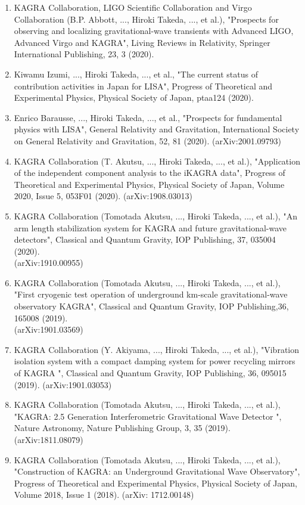 \documentclass[12pt,a4paper]{article}
\begin{document}
\begin{enumerate}
\item KAGRA Collaboration, LIGO Scientific Collaboration and Virgo Collaboration (B.P. Abbott, ..., Hiroki Takeda, ..., et al.), "Prospects for observing and localizing gravitational-wave transients with Advanced LIGO, Advanced Virgo and KAGRA", Living Reviews in Relativity, Springer International Publishing, 23, 3 (2020).

\item Kiwamu Izumi, ..., Hiroki Takeda, ..., et al., "The current status of contribution activities in Japan for LISA", Progress of Theoretical and Experimental Physics, Physical Society of Japan, ptaa124 (2020).

\item Enrico Barausse, ..., Hiroki Takeda, ..., et al., "Prospects for fundamental physics with LISA", General Relativity and Gravitation, International Society on General Relativity and Gravitation, 52, 81 (2020). (arXiv:2001.09793)

\item KAGRA Collaboration (T. Akutsu, ..., Hiroki Takeda, ..., et al.), "Application of the independent component analysis to the iKAGRA data", Progress of Theoretical and Experimental Physics, Physical Society of Japan, Volume 2020, Issue 5, 053F01 (2020). (arXiv:1908.03013)

\item KAGRA Collaboration (Tomotada Akutsu, ..., Hiroki Takeda, ..., et al.), "An arm length stabilization system for KAGRA and future gravitational-wave detectors", Classical and Quantum Gravity, IOP Publishing, 37, 035004 (2020).\\ (arXiv:1910.00955)

\item KAGRA Collaboration (Tomotada Akutsu, ..., Hiroki Takeda, ..., et al.), "First cryogenic test operation of underground km-scale gravitational-wave observatory KAGRA", Classical and Quantum Gravity, IOP Publishing,36, 165008 (2019).\\ (arXiv:1901.03569)

\item KAGRA Collaboration (Y. Akiyama, ..., Hiroki Takeda, ..., et al.), "Vibration isolation system with a compact damping system for power recycling mirrors of KAGRA ", Classical and Quantum Gravity, IOP Publishing, 36, 095015 (2019). (arXiv:1901.03053)

\item KAGRA Collaboration (Tomotada Akutsu, ..., Hiroki Takeda, ..., et al.), "KAGRA: 2.5 Generation Interferometric Gravitational Wave Detector ", Nature Astronomy, Nature Publishing Group, 3, 35 (2019). (arXiv:1811.08079)

\item KAGRA Collaboration (Tomotada Akutsu, ..., Hiroki Takeda, ..., et al.), "Construction of KAGRA: an Underground Gravitational Wave Observatory", Progress of Theoretical and Experimental Physics, Physical Society of Japan, Volume 2018, Issue 1 (2018). (arXiv: 1712.00148)

\end{enumerate}
\end{document}
